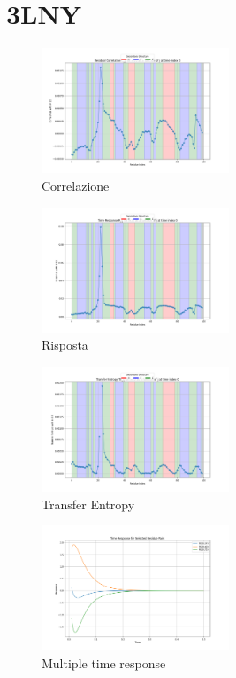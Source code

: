 \documentclass[Lau,binding=0.6cm,oneside,noexaminfo]{sapthesis}
\begin{document}
\section{3LNY}
\begin{figure}[H]
    \centering
    \includegraphics[width=0.5\textwidth]{"images/3LNYResidual Correlation C_ij for i=22 as a function of j at time index 0.png"}
    \caption{Correlazione}
\end{figure}
\begin{figure}[H]
    \centering
    \includegraphics[width=0.5\textwidth]{"images/3LNYTime Response R_ij for i=22 as a function of j at time index 0.png"}
    \caption{Risposta}
\end{figure}

\begin{figure}[H]
    \centering
    \includegraphics[width=0.5\textwidth]{"images/3LNYTransfer Entropy TE_ij for i=22 as a function of j at time index 0.png"}
    \caption{Transfer Entropy}
\end{figure}


\begin{figure}[H]
    \centering
    \includegraphics[width=0.5\textwidth]{"images/3LNYMultiple_time_resposne.png"}
    \caption{Multiple time response}
\end{figure}
\end{document}
